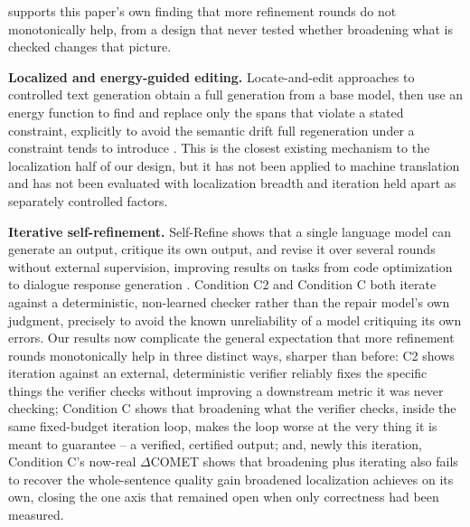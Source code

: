 \documentclass[11pt,letterpaper]{article}
\begin{document}
supports this paper's own finding that more refinement rounds do not monotonically help, from a design that never tested whether broadening what is checked changes that picture.

\textbf{Localized and energy-guided editing.} Locate-and-edit approaches to controlled text generation obtain a full generation from a base model, then use an energy function to find and replace only the spans that violate a stated constraint, explicitly to avoid the semantic drift full regeneration under a constraint tends to introduce \citep{Son2024}. This is the closest existing mechanism to the localization half of our design, but it has not been applied to machine translation and has not been evaluated with localization breadth and iteration held apart as separately controlled factors.

\textbf{Iterative self-refinement.} Self-Refine shows that a single language model can generate an output, critique its own output, and revise it over several rounds without external supervision, improving results on tasks from code optimization to dialogue response generation \citep{Madaan2023}. Condition C2 and Condition C both iterate against a deterministic, non-learned checker rather than the repair model's own judgment, precisely to avoid the known unreliability of a model critiquing its own errors. Our results now complicate the general expectation that more refinement rounds monotonically help in three distinct ways, sharper than before: C2 shows iteration against an external, deterministic verifier reliably fixes the specific things the verifier checks without improving a downstream metric it was never checking; Condition C shows that broadening what the verifier checks, inside the same fixed-budget iteration loop, makes the loop worse at the very thing it is meant to guarantee -- a verified, certified output; and, newly this iteration, Condition C's now-real $\Delta$COMET shows that broadening plus iterating also fails to recover the whole-sentence quality gain broadened localization achieves on its own, closing the one axis that remained open when only correctness had been measured.
\end{document}
